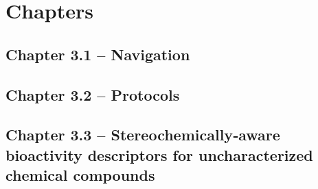 
\chapter{Chapters}
\newpage


\section{Chapter 3.1 -- Navigation}





\newpage



\section{Chapter 3.2 -- Protocols}





\newpage



\section{Chapter 3.3 -- Stereochemically‑aware bioactivity descriptors for uncharacterized chemical compounds}





\newpage


